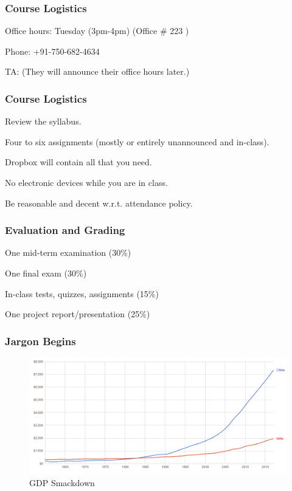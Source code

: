 \documentclass[shownotes,11pt, aspectratio=169]{beamer}
\newenvironment{wideitemize}{\itemize\addtolength{\itemsep}{10pt}}{\enditemize}
\begin{document}
\begin{frame}
\frametitle{Course Logistics}
\begin{wideitemize}
       \item Office hours: Tuesday (3pm-4pm) (Office \# 223 )
       \item Phone: +91-750-682-4634
       \pause
      \item TA: \textbf{} (They will announce their office hours later.)
\end{wideitemize}
\end{frame}

\begin{frame}
\frametitle{Course Logistics}
\begin{wideitemize}
\item Review the syllabus.
\item Four to six assignments (mostly or entirely unannounced and in-class).
\item Dropbox will contain all that you need.
\item No electronic devices while you are in class.
\item Be reasonable and decent w.r.t. attendance policy. 
\end{wideitemize}
\end{frame}

\begin{frame}
\frametitle{Evaluation and Grading}
\begin{wideitemize}
\item One mid-term examination (30\%)
\item One final exam (30\%)
\item In-class tests, quizzes, assignments (15\%)
\item One project report/presentation (25\%)
\end{wideitemize}
\end{frame}

\begin{frame}
\frametitle{Jargon Begins}
\begin{figure}[ht]
  \caption*{GDP Smackdown}
     \includegraphics[width=.95\linewidth]{graphs/L1F1.png}    
    \end{figure}\end{frame}
\end{document}
